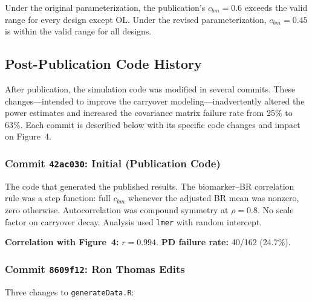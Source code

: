 \documentclass[11pt]{article}
\begin{document}
Under the original parameterization, the publication's
$c_{bm} = 0.6$ exceeds the valid range for every design
except OL. Under the revised parameterization,
$c_{bm} = 0.45$ is within the valid range for all designs.

\subsection{Post-Publication Code History}

After publication, the simulation code was modified in
several commits. These changes---intended to improve the
carryover modeling---inadvertently altered the power
estimates and increased the covariance matrix failure rate
from 25\% to 63\%. Each commit is described below with
its specific code changes and impact on Figure~4.

\subsubsection{Commit \texttt{42ac030}: Initial
              (Publication Code)}

The code that generated the published results. The
biomarker--BR correlation rule was a step function: full
$c_{bm}$ whenever the adjusted BR mean was nonzero, zero
otherwise. Autocorrelation was compound symmetry at
$\rho = 0.8$. No scale factor on carryover decay.
Analysis used \texttt{lmer} with random intercept.

\textbf{Correlation with Figure~4:} $r = 0.994$.
\textbf{PD failure rate:} 40/162 (24.7\%).

\subsubsection{Commit \texttt{8609f12}: Ron Thomas Edits}

Three changes to \texttt{generateData.R}:
\end{document}
